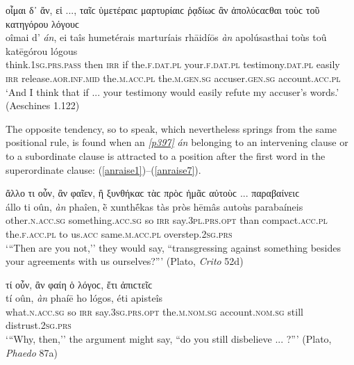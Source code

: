 \begin{exe}
\ex οἶμαι δ᾽ ἄν, εἰ ..., ταῖϲ ὑμετέραιϲ μαρτυρίαιϲ ῥᾳδίωϲ ἂν ἀπολύϲαϲθαι τοὺϲ τοῦ κατηγόρου λόγουϲ\\
\gll oîmai d' \emph{án}, ei taîs humetérais marturíais rhāidíōs \emph{àn} apolúsasthai toùs toû katēgórou lógous\\
think.\textsc{1sg.prs.pass} then \textsc{irr} if the.\textsc{f.dat.pl} your.\textsc{f.dat.pl} testimony.\textsc{dat.pl} easily \textsc{irr} release.\textsc{aor.inf.mid} the.\textsc{m.acc.pl} the.\textsc{m.gen.sg} accuser.\textsc{gen.sg} account.\textsc{acc.pl}\\
\trans `And I think that if ... your testimony would easily refute my accuser's words.' (Aeschines 1.122)
\label{anrepeat14}
\end{exe}

The opposite tendency, so to speak, which nevertheless springs from the same positional rule, is found when an \hyperlink{p397}{\emph{[p397]}} \textit{án} belonging to an intervening clause or to a subordinate clause is attracted to a position after the first word in the superordinate clause: (\ref{anraise1})--(\ref{anraise7}).

\begin{exe}
\ex ἄλλο τι οὖν, ἂν φαῖεν, ἢ ξυνθήκαϲ τὰϲ πρὸϲ ἡμᾶϲ αὐτοὺϲ ... παραβαίνειϲ\\
\gll állo ti oûn, \emph{àn} phaîen, ḕ xunthḗkas tàs pròs hēmâs autoùs parabaíneis\\
other.\textsc{n.acc.sg} something.\textsc{acc.sg} so \textsc{irr} say.\textsc{3pl.prs.opt} than compact.\textsc{acc.pl} the.\textsc{f.acc.pl} to us.\textsc{acc} same.\textsc{m.acc.pl} overstep.\textsc{2sg.prs}\\
\trans `{``}Then are you not,'' they would say, ``transgressing against something besides your agreements with us ourselves?''' (Plato, \textit{Crito} 52d)
\label{anraise1}
\end{exe}

\begin{exe}
\ex τί οὖν, ἂν φαίη ὁ λόγοϲ, ἔτι ἀπιϲτεῖϲ\\
\gll tí oûn, \emph{àn} phaíē ho lógos, éti apisteîs\\
what.\textsc{n.acc.sg} so \textsc{irr} say.\textsc{3sg.prs.opt} the.\textsc{m.nom.sg} account.\textsc{nom.sg} still distrust.\textsc{2sg.prs}\\
\trans `{``}Why, then,'' the argument might say, ``do you still disbelieve ... ?''' (Plato, \textit{Phaedo} 87a)
\label{anraise2}
\end{exe}


